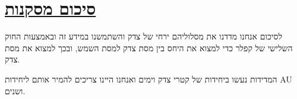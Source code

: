 \documentclass[a4paper, 12pt]{article}
\begin{document}
    \pagebreak %

    \section{\underline{סיכום מסקנות}}
    \begin{flushright}
        לסיכום אנחנו מדדנו את מסלוליהם ירחי של צדק והשתמשנו במידע זה
        ובאמצעות החוק השלישי של קפלר כדי למצוא את היחס בין מסת צדק למסת השמש, ובכך
        למצוא את מסת צדק.

        המדידות נעשו ביחידות של קטרי צדק וימים ואנחנו היינו צריכים
        להמיר אותם ליחידות AU ושנים.
    \end{flushright}
\end{document}
